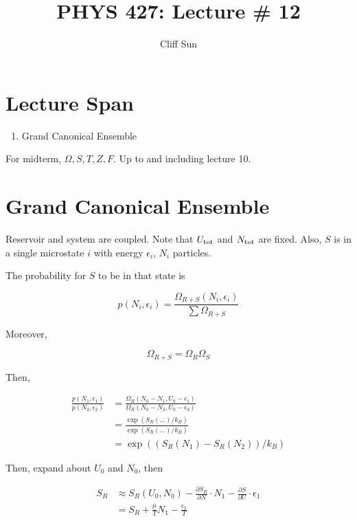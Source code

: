 \documentclass{article}
\title{PHYS 427: Lecture \# 12}
\author{Cliff Sun}
\newtheorem{one minute paper}[theorem]{One Minute Paper}
\begin{document}
\maketitle

\section*{Lecture Span}
\begin{enumerate}
    \item Grand Canonical Ensemble
\end{enumerate}

For midterm, $\Omega, S, T, Z, F$. Up to and including lecture 10. 

\section*{Grand Canonical Ensemble}

Reservoir and system are coupled. Note that $U_{\rm tot}$ and $N_{\rm tot}$ are fixed. Also, $S$ is in a single microstate $i$ with energy $\epsilon_i$, $N_i$ particles. 

The probability for $S$ to be in that state is 

\begin{equation}
    p(N_i, \epsilon_i) = \frac{\Omega_{R + S}(N_i, \epsilon_i)}{\sum \Omega_{R + S}}
\end{equation}

Moreover, 

\begin{equation}
    \Omega_{R + S} = \Omega_R \Omega_S
\end{equation}

Then, 

\begin{align}
    \frac{p(N_1, \epsilon_1)}{p(N_2, \epsilon_2)} &= \frac{\Omega_R(N_0 - N_1, U_0 - \epsilon_1)}{\Omega_R(N_0 - N_2, U_0 - \epsilon_2)} \\
    &= \frac{\exp(S_R(\dots)/k_B)}{\exp(S_R(\dots)/k_B)} \\
    &= \exp((S_R(N_1) - S_R(N_2))/k_B)
\end{align}

Then, expand about $U_0$ and $N_0$, then 

\begin{align}
    S_R &\approx S_R(U_0, N_0) - \frac{\partial S_R}{\partial N} \cdot N_1 - \frac{\partial S}{\partial U}\cdot \epsilon_1\\
    &= S_R + \frac{\mu}{T}N_1 - \frac{\epsilon_1}{T}
\end{align}
\end{document}
